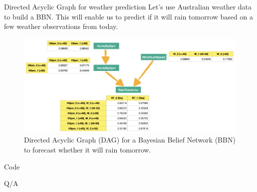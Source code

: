 \documentclass{beamer}
\begin{document}
	\begin{frame}[t]{Directed Acyclic Graph for weather prediction}
		Let’s use Australian weather data to build a BBN. This will enable us to predict if it will rain tomorrow based on a few weather observations from today.
			\begin{figure}
			\centering
			\includegraphics[scale=0.3]{bbn.png}
			\caption{Directed Acyclic Graph (DAG) for a Bayesian Belief Network (BBN) to forecast whether it will rain tomorrow.}
		\end{figure}
	\end{frame}
	
	\begin{frame}
		\begin{center}
			\Huge Code
		\end{center}
	\end{frame}

	\begin{frame}[standout]
		Q/A
	\end{frame}
\end{document}
